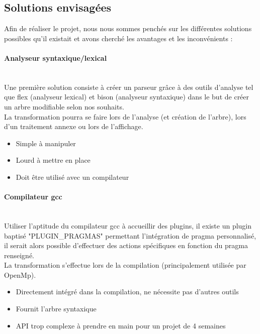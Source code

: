 \documentclass{article}
\begin{document}
	
	\subsection{Solutions envisagées}
	



	Afin de réaliser le projet, nous nous sommes penchés sur les différentes solutions possibles qu'il existait et avons cherché les avantages et les inconvénients :
	
	\paragraph{Analyseur syntaxique/lexical}
	~~\\
	\indent
	Une première solution consiste à créer un parseur grâce à des outils d'analyse tel que flex (analyseur lexical) et bison (analyseur syntaxique) dans le but de créer un arbre modifiable selon nos souhaits.\\
	La transformation pourra se faire lors de l'analyse (et création de l'arbre), lors d'un traitement annexe ou lors de l'affichage.\\
	\begin{itemize}
		\item Simple à manipuler
		\item Lourd à mettre en place
		\item Doit être utilisé avec un compilateur
	\end{itemize}
	
	\paragraph{Compilateur gcc}
		~~\\
	\indent
	Utiliser l'aptitude du compilateur gcc à accueillir des plugins, il existe un plugin baptisé "PLUGIN\_PRAGMAS" permettant l'intégration de pragma personnalisé, il serait alors possible d'effectuer des actions spécifiques en fonction du pragma renseigné.\\ La transformation s'effectue lors de la compilation (principalement utilisée par OpenMp). \\
	\begin{itemize}
		\item Directement intégré dans la compilation, ne nécessite pas d'autres outils
		\item Fournit l'arbre syntaxique
		\item API trop complexe à prendre en main pour un projet de 4 semaines
	\end{itemize}
	
\end{document}
